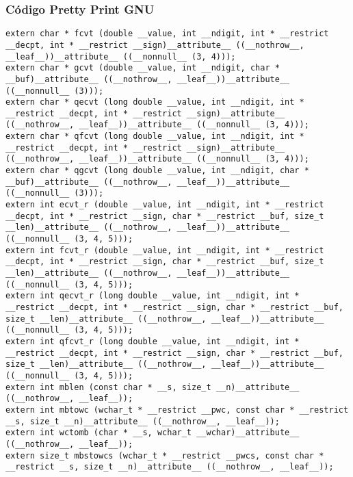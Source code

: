 \documentclass{beamer}
\begin{document}
\begin{frame}[fragile]
\frametitle{C\'odigo Pretty Print GNU}
\begin{verbatim}
extern char * fcvt (double __value, int __ndigit, int * __restrict __decpt, int * __restrict __sign)__attribute__ ((__nothrow__, __leaf__))__attribute__ ((__nonnull__ (3, 4)));
extern char * gcvt (double __value, int __ndigit, char * __buf)__attribute__ ((__nothrow__, __leaf__))__attribute__ ((__nonnull__ (3)));
extern char * qecvt (long double __value, int __ndigit, int * __restrict __decpt, int * __restrict __sign)__attribute__ ((__nothrow__, __leaf__))__attribute__ ((__nonnull__ (3, 4)));
extern char * qfcvt (long double __value, int __ndigit, int * __restrict __decpt, int * __restrict __sign)__attribute__ ((__nothrow__, __leaf__))__attribute__ ((__nonnull__ (3, 4)));
extern char * qgcvt (long double __value, int __ndigit, char * __buf)__attribute__ ((__nothrow__, __leaf__))__attribute__ ((__nonnull__ (3)));
extern int ecvt_r (double __value, int __ndigit, int * __restrict __decpt, int * __restrict __sign, char * __restrict __buf, size_t __len)__attribute__ ((__nothrow__, __leaf__))__attribute__ ((__nonnull__ (3, 4, 5)));
extern int fcvt_r (double __value, int __ndigit, int * __restrict __decpt, int * __restrict __sign, char * __restrict __buf, size_t __len)__attribute__ ((__nothrow__, __leaf__))__attribute__ ((__nonnull__ (3, 4, 5)));
extern int qecvt_r (long double __value, int __ndigit, int * __restrict __decpt, int * __restrict __sign, char * __restrict __buf, size_t __len)__attribute__ ((__nothrow__, __leaf__))__attribute__ ((__nonnull__ (3, 4, 5)));
extern int qfcvt_r (long double __value, int __ndigit, int * __restrict __decpt, int * __restrict __sign, char * __restrict __buf, size_t __len)__attribute__ ((__nothrow__, __leaf__))__attribute__ ((__nonnull__ (3, 4, 5)));
extern int mblen (const char * __s, size_t __n)__attribute__ ((__nothrow__, __leaf__));
extern int mbtowc (wchar_t * __restrict __pwc, const char * __restrict __s, size_t __n)__attribute__ ((__nothrow__, __leaf__));
extern int wctomb (char * __s, wchar_t __wchar)__attribute__ ((__nothrow__, __leaf__));
extern size_t mbstowcs (wchar_t * __restrict __pwcs, const char * __restrict __s, size_t __n)__attribute__ ((__nothrow__, __leaf__));
\end{verbatim}
\end{frame}
\end{document}
